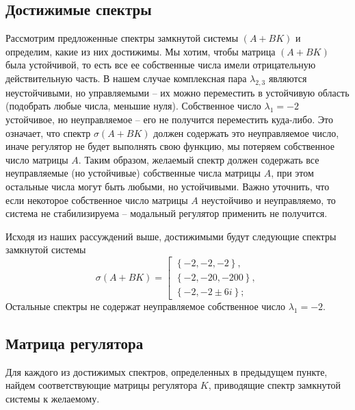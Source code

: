 \documentclass[a4paper, 12pt]{article}
\begin{document}
    \subsection{Достижимые спектры}
    Рассмотрим предложенные спектры замкнутой системы $\left(A+BK\right)$ и определим, какие из них достижимы.
    Мы хотим, чтобы матрица $\left(A+BK\right)$ была устойчивой, то есть все ее собственные числа имели
    отрицательную действительную часть. В нашем случае комплексная пара $\lambda_{2,3}$ являются неустойчивыми,
    но управляемыми -- их можно переместить в устойчивую область (подобрать любые числа, меньшие нуля). Собственное
    число $\lambda_1=-2$ устойчивое, но неуправляемое -- его не получится переместить куда-либо. Это означает, что
    спектр $\sigma\left(A+BK\right)$ должен содержать это неуправляемое число, иначе регулятор не будет выполнять свою
    функцию, мы потеряем собственное число матрицы $A$. Таким образом, желаемый спектр должен содержать все неуправляемые (но устойчивые)
    собственные числа матрицы $A$, при этом остальные числа могут быть любыми, но устойчивыми. Важно уточнить, что
    если некоторое собственное число матрицы $A$ неустойчиво и неуправляемо, то система не стабилизируема -- модальный
    регулятор применить не получится.


    Исходя из наших рассуждений выше, достижимыми будут следующие спектры замкнутой системы
    $$
    \sigma\left(A+BK\right)= 
    \left[ 
      \begin{gathered} 
        \left\{-2,-2,-2\right\}, \\ 
        \left\{-2,-20,-200\right\},\\
        \left\{-2,-2\pm6i\right\};
      \end{gathered} 
\right.
    $$
    Остальные спектры не содержат неуправляемое собственное число $\lambda_1=-2$.


    \subsection{Матрица регулятора}
    Для каждого из достижимых спектров, определенных в предыдущем пункте, найдем
    соответствующие матрицы регулятора $K$, приводящие спектр замкнутой системы
    к желаемому.
\end{document}

